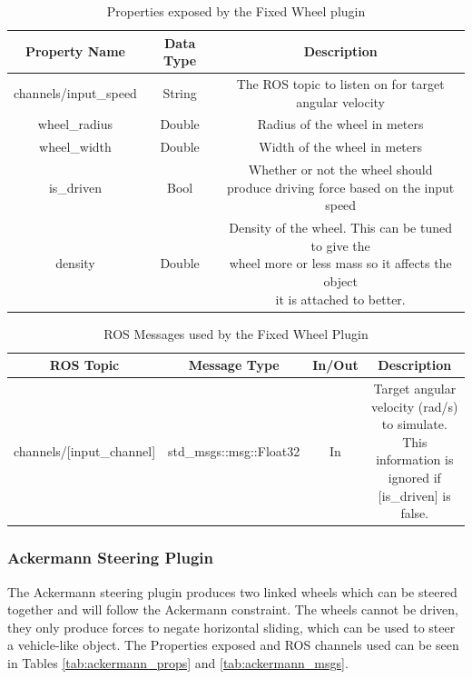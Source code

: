 \begin{itemize}
\begin{table}[h!]
	\centering
	\caption{Properties exposed by the Fixed Wheel plugin}
	\label{tab:fixedwheel_props}
	\begin{tabular}{c|c|c}
	Property Name & Data Type & Description\\ \hline \hline
	channels/input\_speed & String & The ROS topic to listen on for target angular velocity \\ \hline
	wheel\_radius & Double & Radius of the wheel in meters\\ \hline
	wheel\_width & Double & Width of the wheel in meters\\ \hline
	is\_driven & Bool & \makecell{Whether or not the wheel should\\ produce driving force based on the input speed}\\ \hline
	density & Double & \makecell{Density of the wheel. This can be tuned to give the\\ wheel more or less mass so it affects the object\\ it is attached to better.}
	\end{tabular}
\end{table}

\begin{table}[h!]
	\centering
	\caption{ROS Messages used by the Fixed Wheel Plugin}
	\label{tab:fixedwheel_msgs}
	\begin{tabular}{c|c|c|c}
	ROS Topic & Message Type & In/Out & Description\\ \hline \hline
	channels/[input\_channel] & std\_msgs::msg::Float32 & In & \makecell{Target angular velocity (rad/s) to simulate.\\ This information is ignored if [is\_driven] is false.}
	\end{tabular}
\end{table}

\subsubsection*{Ackermann Steering Plugin}
The Ackermann steering plugin produces two linked wheels which can be steered together and will follow the Ackermann constraint. The wheels cannot be driven, they only produce forces to negate horizontal sliding, which can be used to steer a vehicle-like object. The Properties exposed and ROS channels used can be seen in Tables \ref{tab:ackermann_props} and \ref{tab:ackermann_msgs}.


\end{itemize}

